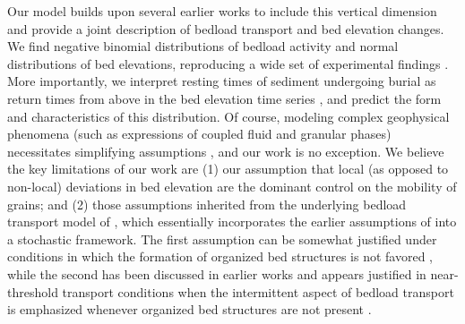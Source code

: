 \documentclass[draft]{agujournal2018}
\begin{document}
Our model builds upon several earlier works \citep[e.g.,][]{Ancey2008,Martin2014} to include this vertical dimension and provide a joint description of bedload transport and bed elevation changes.
We find negative binomial distributions of bedload activity and normal distributions of bed elevations, reproducing a wide set of experimental findings \citep{Ancey2008, Heyman2016, Wong2007, Singh2009, Martin2014}.
More importantly, we interpret resting times of sediment undergoing burial as return times from above in the bed elevation time series \citep[e.g.,][]{Voepel2013,Martin2014}, and predict the form and characteristics of this distribution.
Of course, modeling complex geophysical phenomena (such as expressions of coupled fluid and granular phases) necessitates simplifying assumptions \citep[e.g.,][]{Larsen2016}, and our work is no exception.
We believe the key limitations of our work are (1) our assumption that local (as opposed to non-local) deviations in bed elevation are the dominant control on the mobility of grains; and (2) those assumptions inherited from the underlying bedload transport model of \citet{Ancey2008}, which essentially incorporates the earlier assumptions of \citet{Einstein1950} into a stochastic framework.
The first assumption can be somewhat justified under conditions in which the formation of organized bed structures is not favored \citep[e.g.,][]{Hassan2008}, while the second has been discussed in earlier works and appears justified in near-threshold transport conditions when the intermittent aspect of bedload transport is emphasized \citep[e.g.,][]{Ancey2008,Heyman2014} whenever organized bed structures are not present \citep[e.g.,][]{Dhont2018}.
\end{document}
